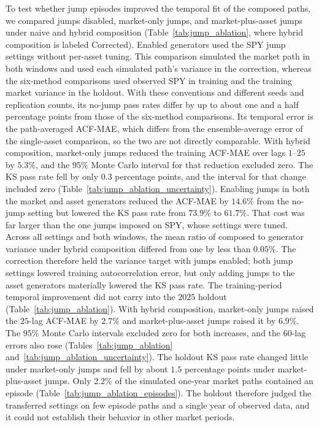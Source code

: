 To test whether jump episodes improved the temporal fit of the
composed paths, we compared jumps
disabled, market-only jumps, and market-plus-asset jumps under naive
and hybrid composition (Table~\ref{tab:jump_ablation}, where hybrid
composition is labeled Corrected). Enabled generators used the SPY
jump settings without per-asset tuning. This comparison simulated the market path in both windows and used
each simulated path's variance in the correction, whereas the
six-method comparisons used observed SPY in training and the training
market variance in the holdout. With these conventions and different
seeds and replication counts, its no-jump pass rates differ by up to
about one and a half percentage points from those of the six-method
comparisons. Its temporal error is the path-averaged
ACF-MAE, which differs from the ensemble-average error of the
single-asset comparison, so the two are not directly comparable. With
hybrid composition, market-only jumps reduced the training ACF-MAE
over lags $1$--$25$ by $5.3\%$, and the $95\%$ Monte Carlo interval for that reduction excluded zero.
The KS pass rate fell by only $0.3$ percentage points, and the
interval for that change included zero
(Table~\ref{tab:jump_ablation_uncertainty}). Enabling
jumps in both the market and asset generators reduced the ACF-MAE by
$14.6\%$ from the no-jump setting but lowered the KS pass rate from $73.9\%$ to
$61.7\%$. That cost was far larger than the one jumps imposed on SPY,
whose settings were tuned. Across all settings and both windows, the mean
ratio of composed to generator variance under hybrid composition
differed from one by less than $0.05\%$. The correction therefore held
the variance target with jumps enabled; both jump settings lowered
training autocorrelation error, but only adding jumps to the asset
generators materially lowered the KS pass rate. The training-period
temporal improvement did not carry into the $2025$ holdout
(Table~\ref{tab:jump_ablation}). With hybrid composition, market-only
jumps raised the $25$-lag ACF-MAE by $2.7\%$ and market-plus-asset
jumps raised it by $6.9\%$. The $95\%$ Monte Carlo intervals excluded
zero for both increases, and the $60$-lag errors also rose
(Tables~\ref{tab:jump_ablation}
and~\ref{tab:jump_ablation_uncertainty}). The holdout KS pass rate
changed little under market-only jumps and fell by about $1.5$
percentage points under market-plus-asset jumps. Only $2.2\%$ of the
simulated one-year market paths contained an episode
(Table~\ref{tab:jump_ablation_episodes}). The holdout therefore judged
the transferred settings on few episode paths and a single year of
observed data, and it could not establish their behavior in other
market periods.

